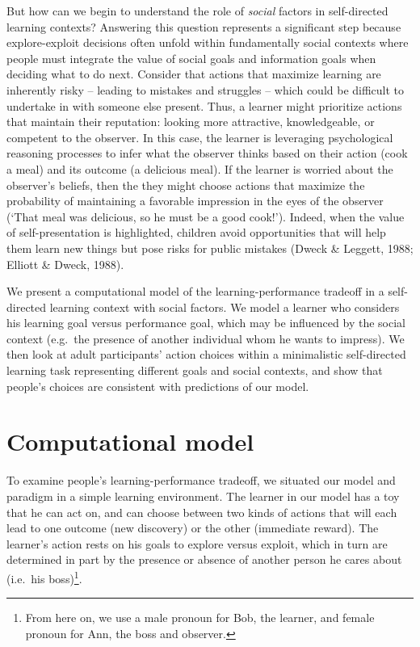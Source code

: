 \documentclass[10pt, letterpaper]{article}
\begin{document}
But how can we begin to understand the role of \emph{social} factors in
self-directed learning contexts? Answering this question represents a
significant step because explore-exploit decisions often unfold within
fundamentally social contexts where people must integrate the value of
social goals and information goals when deciding what to do next.
Consider that actions that maximize learning are inherently risky --
leading to mistakes and struggles -- which could be difficult to
undertake in with someone else present. Thus, a learner might prioritize
actions that maintain their reputation: looking more attractive,
knowledgeable, or competent to the observer. In this case, the learner
is leveraging psychological reasoning processes to infer what the
observer thinks based on their action (cook a meal) and its outcome (a
delicious meal). If the learner is worried about the observer's beliefs,
then the they might choose actions that maximize the probability of
maintaining a favorable impression in the eyes of the observer (`That
meal was delicious, so he must be a good cook!'). Indeed, when the value
of self-presentation is highlighted, children avoid opportunities that
will help them learn new things but pose risks for public mistakes
(Dweck \& Leggett, 1988; Elliott \& Dweck, 1988).

We present a computational model of the learning-performance tradeoff in
a self-directed learning context with social factors. We model a learner
who considers his learning goal versus performance goal, which may be
influenced by the social context (e.g.~the presence of another
individual whom he wants to impress). We then look at adult
participants' action choices within a minimalistic self-directed
learning task representing different goals and social contexts, and show
that people's choices are consistent with predictions of our model.

\section{Computational model}\label{computational-model}

To examine people's learning-performance tradeoff, we situated our model
and paradigm in a simple learning environment. The learner in our model
has a toy that he can act on, and can choose between two kinds of
actions that will each lead to one outcome (new discovery) or the other
(immediate reward). The learner's action rests on his goals to explore
versus exploit, which in turn are determined in part by the presence or
absence of another person he cares about (i.e.~his
boss)\footnote{From here on, we use a male pronoun for Bob, the learner, and female pronoun for Ann, the boss and observer.}.
\end{document}
